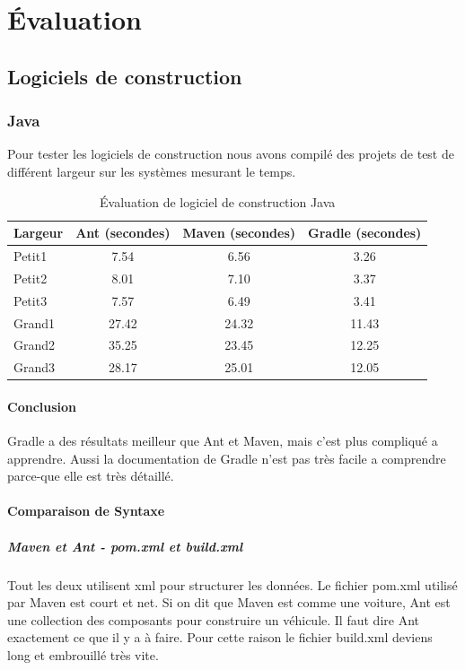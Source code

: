 \chapter{Évaluation}
\label{eval}

\section{Logiciels de construction}
\subsection{Java}
Pour tester les logiciels de construction nous avons compilé des projets de test de différent largeur sur les systèmes mesurant le temps.

\begin{table}[H]
\centering
\begin{tabular}{l|ccc} \toprule
	\textbf{Largeur} & \textbf{Ant (secondes)} & \textbf{Maven (secondes)} & \textbf{Gradle (secondes)}\\ \midrule
	Petit1 & 7.54 & 6.56 & 3.26\\
	Petit2 & 8.01 & 7.10 & 3.37\\
	Petit3 & 7.57 & 6.49 & 3.41\\
	Grand1 & 27.42 & 24.32 & 11.43\\
	Grand2 & 35.25 & 23.45 & 12.25\\
	Grand3 & 28.17 & 25.01 & 12.05\\ \bottomrule
\end{tabular}
\caption{Évaluation de logiciel de construction Java}
\end{table}
\subsubsection{Conclusion}
Gradle a des résultats meilleur que Ant et Maven, mais c'est plus compliqué a apprendre. Aussi la documentation de Gradle n'est pas très facile a comprendre parce-que elle est très détaillé.

\subsubsection{Comparaison de Syntaxe}
	\paragraph{Maven et Ant - pom.xml et build.xml}
		Tout les deux utilisent xml pour structurer les données. Le fichier pom.xml utilisé par Maven est court et net. Si on dit que Maven est comme une voiture, Ant est une collection des composants pour construire un véhicule. Il faut dire Ant exactement ce que il y a à faire. Pour cette raison le fichier build.xml deviens long et embrouillé très vite.
